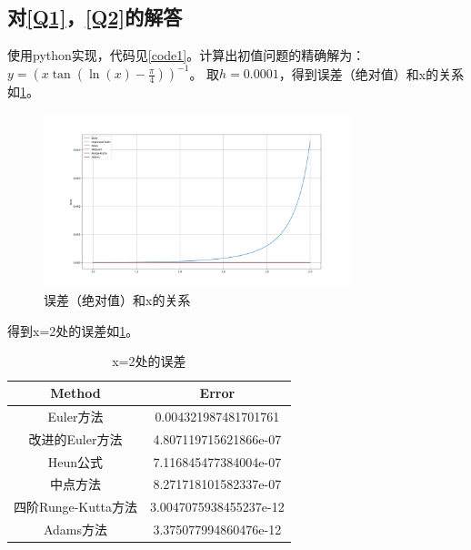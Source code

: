 \documentclass[a4paper,11pt,notitlepage]{article}
\begin{document}
\subsection{对\ref{Q1}，\ref{Q2}的解答}
使用python实现，代码见\cref{code1}。计算出初值问题的精确解为：$y=(x \tan(\ln(x)-\frac{\pi}{4}))^{-1}$。
取$h=0.0001$，得到误差（绝对值）和x的关系如\cref{pic:1}。
\begin{figure}[H]
    \centering
    \includegraphics[width=0.8\textwidth]{../picture/Tenth_Chapter.png}
    \caption{误差（绝对值）和x的关系}
    \label{pic:1}
\end{figure}
得到x=2处的误差如\cref{tab:1}。
\begin{table}[ht]
    \begin{center}
    \begin{tabular}{|c|c|}
        \hline
        Method & Error \\
        \hline
        Euler方法 & 0.004321987481701761 \\
        \hline
        改进的Euler方法 & 4.807119715621866e-07 \\
        \hline
        Heun公式 & 7.116845477384004e-07 \\
        \hline
        中点方法 & 8.271718101582337e-07 \\
        \hline
        四阶Runge-Kutta方法 & 3.0047075938455237e-12\\
        \hline
        Adams方法&3.375077994860476e-12\\
        \hline
        \end{tabular}
        \caption{x=2处的误差}
        \label{tab:1}
    \end{center}
\end{table}
\end{document}
